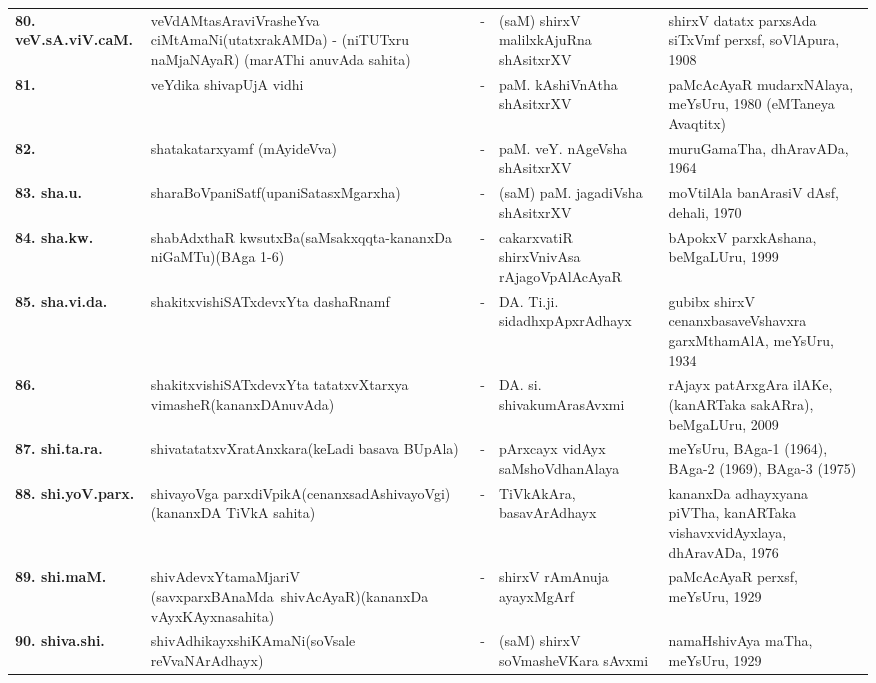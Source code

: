 {\begin{longtable}{@{}lp{5cm}cp{5cm}<{\raggedright}p{3cm}<{\raggedright}@{}}
{\bf 80. veV.sA.viV.caM.} & veVdAMtasAraviVrasheYva ciMtAmaNi\newline (utatxrakAMDa) - (niTUTxru naMja\-NAyaR) (marAThi anuvAda sahita) &-& (saM) shirxV malilxkAjuRna shAsitxrXV & shirxV datatx parxsAda siTxVmf perxsf, soVlApura, 1908\\
{\bf 81. } & veYdika shivapUjA vidhi &-& paM. kAshiVnAtha shAsitxrXV & paMcAcAyaR mudarxNAlaya, meYsUru, 1980 (eMTaneya Avaqtitx)\\
{\bf 82. } & shatakatarxyamf (mAyideVva) &-& paM. veY. nAgeVsha shAsitxrXV & muruGamaTha, dhAravADa, 1964\\
{\bf 83. sha.u.} & sharaBoVpaniSatf\newline (upaniSatasxMgarxha) &-& (saM) paM. jagadiVsha shAsitxrXV & moVtilAla banArasiV dAsf, dehali, 1970\\
{\bf 84. sha.kw.} & shabAdxthaR kwsutxBa\newline (saMsakxqqta-kananxDa niGaMTu)\newline (BAga 1-6) &-& cakarxvatiR shirxVnivAsa rAjagoVpAlAcAyaR & bApokxV parxkAshana, beMgaLUru, 1999\\
{\bf 85. sha.vi.da.} & shakitxvishiSATxdevxYta dashaRnamf &-& DA. Ti.ji. sidadhxpApxrAdhayx & gubibx shirxV cenanxbasaveVshavxra garxMthamAlA, meYsUru, 1934\\
{\bf 86. } & shakitxvishiSATxdevxYta tatatxvXtarxya vimasheR\newline (kananxDAnuvAda) &-& DA. si. shivakumArasAvxmi & rAjayx patArxgAra ilAKe, (kanARTaka sakARra), beMgaLUru, 2009\\
{\bf 87. shi.ta.ra.} & shivatatatxvXratAnxkara\newline (keLadi basava BUpAla) &-& pArxcayx vidAyx saMshoVdhanAlaya & meYsUru, BAga-1 (1964), BAga-2 (1969), BAga-3 (1975)\\
{\bf 88. shi.yoV.parx.} & shivayoVga parxdiVpikA\newline (\hbox{cenanxsadAshiva\-yoVgi})\newline (kananxDA TiVkA sahita) &-& TiVkAkAra, basavArAdhayx & kananxDa adhayxyana piVTha, kanARTaka vishavxvidAyxlaya, dhAravADa, 1976\\
{\bf 89. shi.maM.} & shivAdevxYtamaMjariV \hbox{(savxparxBAnaMda shivAcAyaR)}\newline (kananxDa vAyxKAyxnasahita) &-& shirxV rAmAnuja ayayxMgArf & paMcAcAyaR perxsf, meYsUru, 1929\\
{\bf 90. shiva.shi.} & shivAdhikayxshiKAmaNi\newline (soVsale \hbox{reVvaNArAdhayx}) &-& (saM) shirxV soVmasheVKara sAvxmi & namaHshivAya maTha, meYsUru, 1929\\

\end{longtable}}
